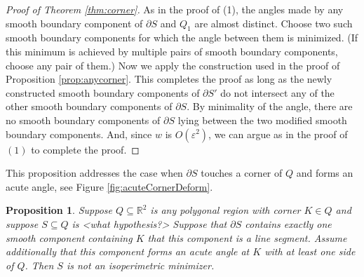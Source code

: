 \documentclass[leqno]{article}
\numberwithin{equation}{section}
\theoremstyle{definition}
\theoremstyle{remark}
\theoremstyle{plain}
\newtheorem{proposition}[equation]{Proposition}
\begin{document}
\begin{proof}[Proof of Theorem \ref{thm:corner}]
As in the proof of (1), the angles made by any smooth boundary component of $\partial S$ and $Q_1$ are almost distinct.  Choose two such smooth boundary components for which the angle between them is minimized.  (If this minimum is achieved by multiple pairs of smooth boundary components, choose any pair of them.)  Now we apply the construction used in the proof of Proposition \ref{prop:anycorner}.  This completes the proof as long as the newly constructed smooth boundary components of $\partial S'$ do not intersect any of the other smooth boundary components of $\partial S$. By minimality of the angle, there are no smooth boundary components of $\partial S$ lying between the two modified smooth boundary components. And, since $w$ is $O(\varepsilon^2)$, we can argue as in the proof of $(1)$ to complete the proof.

\end{proof}













\iffalse

This proposition addresses the case when $\partial S$ touches a corner of $Q$ and forms an acute angle, see Figure \ref{fig:acuteCornerDeform}.

\begin{proposition}\label{prop:acuteCorner}
    Suppose $Q \subseteq \mathbb{R}^2$ is any polygonal region with corner $K\in Q$ and suppose $S \subseteq Q$ is <what hypothesis?> Suppose that $\partial S$ contains exactly one smooth component containing $K$ that this component is a line segment.  Assume additionally that this component forms an acute angle at $K$ with at least one side of $Q$.  Then $S$ is not an isoperimetric minimizer.
\end{proposition}
\end{document}
